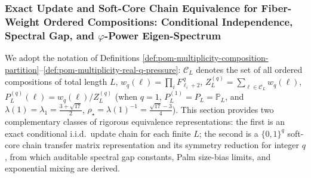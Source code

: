 %
%

\subsubsection{Exact Update and Soft-Core Chain Equivalence for Fiber-Weight Ordered Compositions: Conditional Independence, Spectral Gap, and \texorpdfstring{$\varphi$}{phi}-Power Eigen-Spectrum}\label{subsec:pom-multiplicity-composition-exact-update-softcore}
We adopt the notation of Definitions \ref{def:pom-multiplicity-composition-partition}--\ref{def:pom-multiplicity-real-q-pressure}:
\(\mathcal{C}_L\) denotes the set of all ordered compositions of total length \(L\),
\(
w_q(\boldsymbol{\ell})=\prod_i F_{\ell_i+2}^{\,q}
\),
\(
Z_L^{(q)}=\sum_{\boldsymbol{\ell}\in\mathcal{C}_L}w_q(\boldsymbol{\ell})
\),
\(
P_L^{(q)}(\boldsymbol{\ell})=w_q(\boldsymbol{\ell})/Z_L^{(q)}
\)
(when \(q=1\), \(P_L^{(1)}=P_L=\mathbb{P}_L\), and \(\lambda(1)=\lambda_1=\frac{3+\sqrt{17}}{2}\), \(\rho_\star=\lambda(1)^{-1}=\frac{\sqrt{17}-3}{4}\)).
This section provides two complementary classes of rigorous equivalence representations: the first is an exact conditional i.i.d.\ update chain for each finite \(L\);
the second is a \(\{0,1\}^q\) soft-core chain transfer matrix representation and its symmetry reduction for integer \(q\),
from which auditable spectral gap constants, Palm size-bias limits, and exponential mixing are derived.


